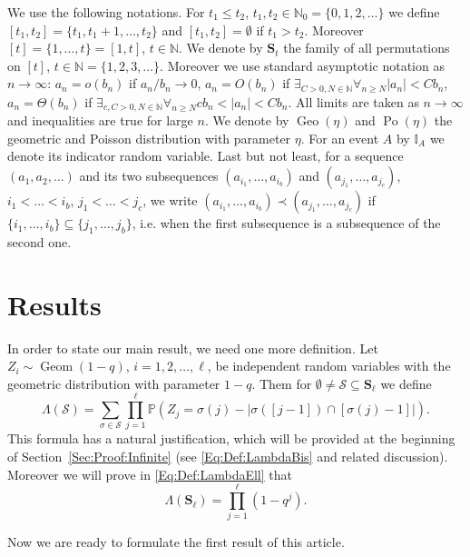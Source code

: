 \documentclass[letterpaper,11pt]{article}
\theoremstyle{definition}
\theoremstyle{remark}
\renewcommand{\le}{\leqslant}
\renewcommand{\ge}{\geqslant}
\newcommand{\bS}{\mathbf{S}}
\newcommand{\product}{\Lambda}
\newcommand{\productO}{\Lambda(\cS)}
\newcommand{\Pra}[1]{\mathbb{P}\left(#1\right)}
\newcommand{\Ind}{\mathbb{I}}
\newcommand{\NN}{\mathbb{N}}
\newcommand{\cS}{\mathcal{S}}
\newcommand{\subseq}{\prec}
\begin{document}
We use the following notations.
For $t_1\le t_2$, $t_1,t_2\in \NN_0=\{0,1,2,\ldots\}$ we define $[t_1,t_2]=\{t_1,t_1+1,\ldots,t_2\}$ and $[t_1,t_2]=\emptyset$ if $t_1>t_2$. Moreover $[t]=\{1,\ldots,t\}=[1,t]$, $t\in \NN$. We denote by $\bS_t$ the family of all permutations on $[t]$, $t\in \NN=\{1,2,3,\ldots\}$.
Moreover we use standard asymptotic notation as $n\to \infty$: $a_n=o(b_n)$ if $a_n/b_n\to 0$, $a_n=O(b_n)$ if $\exists_{C>0, N\in \NN}\forall_{n\ge N}|a_n|< Cb_n$, $a_n=\Theta(b_n)$ if $\exists_{c,C>0, N\in \NN}\forall_{n\ge N}cb_n<|a_n|< Cb_n$. All limits are taken as $n\to \infty$ and inequalities are true for large $n$.
We denote by $\operatorname{Geo}(\eta)$ and $\operatorname{Po}(\eta)$ the geometric and Poisson distribution with parameter $\eta$. For  an event $A$ by $\Ind_A$ we denote its indicator random variable.
Last but not least, for a sequence $(a_1,a_2,\ldots)$ and its two subsequences $(a_{i_1},\ldots,a_{i_b})$ and $(a_{j_1},\ldots,a_{j_c})$, $i_1<\ldots<i_b$, $j_1<\ldots<j_c$, we write $(a_{i_1},\ldots,a_{i_b})\subseq (a_{j_1},\ldots,a_{j_c})$ if $\{i_1,\ldots,i_b\}\subseteq\{j_1,\ldots,j_b\}$, i.e. when the first subsequence is a subsequence of the second one.

\section{Results}



In order to state our main result, we need one more definition. 
Let $Z_i\sim \operatorname{Geom}(1-q)$, $i=1,2,\ldots,\ell$, be independent random variables with the geometric distribution with parameter $1-q$. Them for $\emptyset\neq\cS\subseteq \bS_\ell$ we define
\begin{equation}\label{Eq:Def:LambdaS}\productO=\sum_{\sigma\in \cS}\prod_{j=1}^{\ell}\Pra{Z_j=\sigma(j)-|\sigma([j-1])\cap [\sigma(j)-1]|}.\end{equation}
This formula has a natural justification, which will be provided at the beginning of Section~\ref{Sec:Proof:Infinite} (see \eqref{Eq:Def:LambdaBis} and related discussion). Moreover we will prove in \eqref{Eq:Def:LambdaEll} that  
\begin{equation}\label{Eq:Def:Product}
	\product(\bS_\ell)=\prod_{j=1}^{\ell}(1-q^j).
\end{equation}



Now we are ready to formulate the first result of this article.
\end{document}
